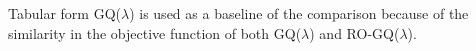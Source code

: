 \documentclass[conference]{IEEEtran}
\begin{document}
Tabular form GQ($\lambda$) is used as a baseline of the comparison because of the similarity in the objective function of both GQ($\lambda$) and RO-GQ($\lambda$).



%

  







\newpage
\end{document}
